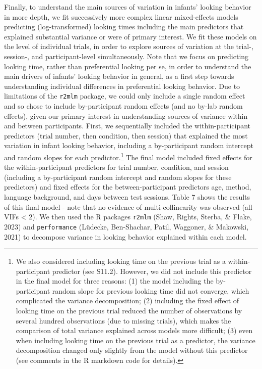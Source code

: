\documentclass[
  man, donotrepeattitle,floatsintext]{apa6}
\begin{document}
Finally, to understand the main sources of variation in infants' looking behavior in more depth, we fit successively more complex linear mixed-effects models predicting (log-transformed) looking times including the main predictors that explained substantial variance or were of primary interest.
We fit these models on the level of individual trials, in order to explore sources of variation at the trial-, session-, and participant-level simultaneously.
Note that we focus on predicting looking time, rather than preferential looking per se, in order to understand the main drivers of infants' looking behavior in general, as a first step towards understanding individual differences in preferential looking behavior.
Due to limitations of the \texttt{r2mlm} package, we could only include a single random effect and so chose to include by-participant random effects (and no by-lab random effects), given our primary interest in understanding sources of variance within and between participants.
First, we sequentially included the within-participant predictors (trial number, then condition, then session) that explained the most variation in infant looking behavior, including a by-participant random intercept and random slopes for each predictor.\footnote{We also considered including looking time on the previous trial as a within-participant predictor (see S11.2). However, we did not include this predictor in the final model for three reasons:
  (1) the model including the by-participant random slope for previous looking time did not converge, which complicated the variance decomposition; (2) including the fixed effect of looking time on the previous trial reduced the number of observations by several hundred observations (due to missing trials), which makes the comparison of total variance explained across models more difficult; (3) even when including looking time on the previous trial as a predictor, the variance decomposition changed only slightly from the model without this predictor (see comments in the R markdown code for details).}
The final model included fixed effects for the within-participant predictors for trial number, condition, and session (including a by-participant random intercept and random slopes for these predictors) and fixed effects for the between-participant predictors age, method, language background, and days between test sessions.
Table 7 shows the results of this final model - note that no evidence of multi-collinearity was observed (all VIFs \textless{} 2).
We then used the R packages \texttt{r2mlm} (Shaw, Rights, Sterba, \& Flake, 2023) and \texttt{performance} (Lüdecke, Ben-Shachar, Patil, Waggoner, \& Makowski, 2021) to decompose variance in looking behavior explained within each model.
\end{document}
